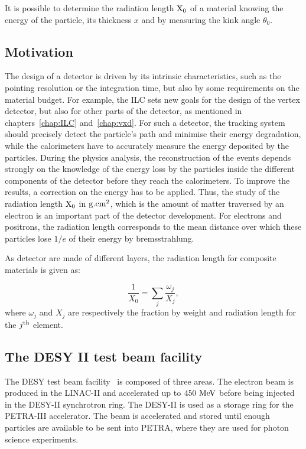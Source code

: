    It is possible to determine the radiation length $\rm{X_0}$ of a material knowing the energy of the particle, its thickness $x$ and by measuring the kink angle $\theta_0$.

    \subsection{Motivation}

    The design of a detector is driven by its intrinsic characteristics, such as the pointing resolution or the integration time, but also by some requirements on the material budget.
    For example, the \gls{ILC} sets new goals for the design of the vertex detector, but also for other parts of the detector, as mentioned in chapters~\ref{chap:ILC} and~\ref{chap:vxd}.
    For such a detector, the tracking system should precisely detect the particle's path and minimise their energy degradation, while the calorimeters have to accurately measure the energy deposited by the particles.
    During the physics analysis, the reconstruction of the events depends strongly on the knowledge of the energy loss by the particles inside the different components of the detector before they reach the calorimeters. 
    To improve the results, a correction on the energy has to be applied.
    Thus, the study of the radiation length $\rm{X_{0}}$ in $\rm{g.cm}^{2}$, which is the amount of matter traversed by an electron is an important part of the detector development.
    For electrons and positrons, the radiation length corresponds to the mean distance over which these particles lose $1/e$ of their energy by bremsstrahlung.

    As detector are made of different layers, the radiation length for composite materials is given as:

    \begin{equation}
      \frac{1}{X_{0}} = \sum_{j} \frac{\omega_{j}}{X_{j}},
    \end{equation}
   where $\omega_{j}$ and $X_{j}$ are respectively the fraction by weight and radiation length for the $j^{\rm{th}}$ element.

    \subsection{The DESY II test beam facility}

    The \gls{DESY} test beam facility~\cite{DESYII} is composed of three areas.
    The electron beam is produced in the LINAC-II and accelerated up to $450~\rm{MeV}$ before being injected in the DESY-II synchrotron ring.
    The DESY-II is used as a storage ring for the PETRA-III accelerator. 
    The beam is accelerated and stored until enough particles are available to be sent into PETRA, where they are used for photon science experiments.
    
